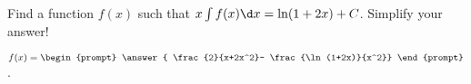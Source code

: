\documentclass{ximera}
\author{Jim Talamo}
\begin{document}
\begin{exercise}
Find a function $f(x)$ such that $x \int f(x) \d x = \ln(1+2x) +C$.  Simplify your answer!

$f(x) = \begin{prompt} \answer{ \frac{2}{x+2x^2}- \frac{\ln(1+2x)}{x^2}} \end{prompt}$.


\end{exercise}
\end{document}
